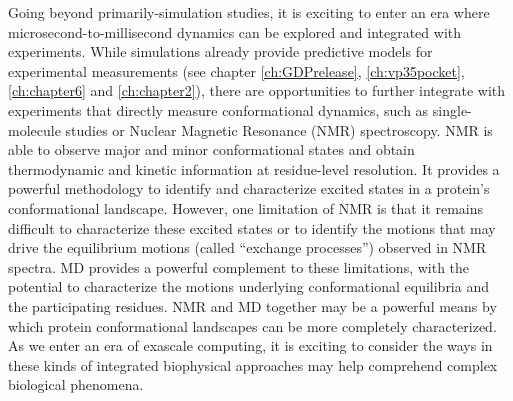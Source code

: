 \documentclass[../main.tex]{subfiles}
\begin{document}
        Going beyond primarily-simulation studies, it is exciting to enter an era where microsecond-to-millisecond dynamics can be explored and integrated with experiments. While simulations already provide predictive models for experimental measurements (see chapter \ref{ch:GDPrelease}, \ref{ch:vp35pocket}, \ref{ch:chapter6} and \ref{ch:chapter2}), there are opportunities to further integrate with experiments that directly measure conformational dynamics, such as single-molecule studies or Nuclear Magnetic Resonance (NMR) spectroscopy. NMR is able to observe major and minor conformational states and obtain thermodynamic and kinetic information at residue-level resolution. It provides a powerful methodology to identify and characterize excited states in a protein’s conformational landscape. However, one limitation of NMR is that it remains difficult to characterize these excited states or to identify the motions that may drive the equilibrium motions (called “exchange processes”) observed in NMR spectra. MD provides a powerful complement to these limitations, with the potential to characterize the motions underlying conformational equilibria and the participating residues. NMR and MD together may be a powerful means by which protein conformational landscapes can be more completely characterized. As we enter an era of exascale computing, it is exciting to consider the ways in these kinds of integrated biophysical approaches may help comprehend complex biological phenomena.

\end{document}
